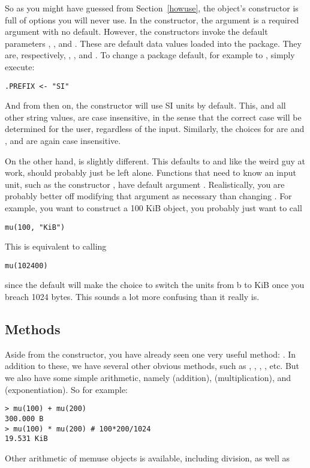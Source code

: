 So as you might have guessed from Section~\ref{howuse}, the  object's constructor is full of options you will never use.  In the constructor, the argument  is a required argument with no default.  However, the constructors invoke the default parameters , , and .  These are default data values loaded into the package. They are, respectively, , , and .  To change a package default, for example  to , simply execute:
\begin{lstlisting}[language=rr]
.PREFIX <- "SI"
\end{lstlisting}
And from then on, the constructor will use SI units by default.  This, and all other string values, are case insensitive, in the sense that the correct case will be determined for the user, regardless of the input.  Similarly, the choices for  are  and , and are again case insensitive.

On the other hand,  is slightly different.  This defaults to  and like the weird guy at work, should probably just be left alone.  Functions that need to know an input unit, such as the constructor , have default argument .  Realistically, you are probably better off modifying that argument as necessary than changing .  For example, you want to construct a 100 KiB  object, you probably just want to call
\begin{lstlisting}[language=rr]
mu(100, "KiB")
\end{lstlisting}
This is equivalent to calling
\begin{lstlisting}[language=rr]
mu(102400)
\end{lstlisting}
since the default  will make the choice to switch the units from b to KiB once you breach 1024 bytes.  This sounds a lot more confusing than it really is.



\subsection{Methods}
Aside from the constructor, you have already seen one very useful method:  .  In addition to these, we have several other obvious methods, such as , , , , etc.  But we also have some simple arithmetic, namely  (addition),  (multiplication), and  (exponentiation).  So for example:
\begin{lstlisting}[language=rr]
> mu(100) + mu(200)
300.000 B
> mu(100) * mu(200) # 100*200/1024
19.531 KiB
\end{lstlisting}
Other arithmetic of memuse objects is available, including division, as well as 

